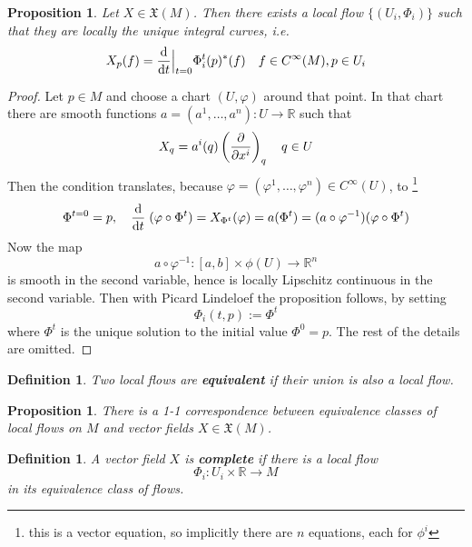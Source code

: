 \documentclass{article}
\numberwithin{theorem}{section}
\newtheorem{proposition}[theorem]{Proposition}
\newtheorem{definition}[theorem]{Definition}
\newcommand{\R}{\mathbb{R}}
\newcommand{\1}{\mathds{1}}
\begin{document}
\begin{proposition}
    Let $X\in \mathfrak{X}(M)$. Then there exists a local flow $\{ (U_i, \Phi_i)\}$ such that they are locally the unique integral curves, i.e. 
    \[ X_p(f) = \dv{}{t}\Big|_{t=0} \Phi_i^t(p)^*(f) \quad f \in C^\infty(M), p \in U_i \]
\end{proposition}
\begin{proof}
    Let $p \in M$ and choose a chart $(U,\varphi)$ around that point. In that chart there are smooth functions $a = (a^1, \dots, a^n) : U \to \R$ such that 
    \[ X_q  = a^i(q) \left( \pdv{}{x^i} \right)_q \quad q\in U   \]
    Then the condition translates, because $\varphi = (\varphi^1, \dots, \varphi^n) \in C^\infty(U)$, to \footnote{this is a vector equation, so implicitly there are $n$ equations, each for $\phi^i$} 
    \[ \Phi^{t = 0 } =p, \quad  \dv{}{t} \; (\varphi \circ \Phi^t) = X_{\Phi^t }(\varphi) = a(\Phi^t)  = (a \circ \varphi^{-1})(\varphi\circ \Phi^t)\]
    Now the map 
    \[ a\circ \varphi^{-1} : [a,b] \times \phi(U) \to \R^n \]
    is smooth in the second variable, hence is locally Lipschitz continuous in the second variable. Then with Picard Lindeloef the proposition follows, by setting 
    \[ \Phi_i(t,p) := \Phi^t  \]
    where $\Phi^t$ is the unique solution to the initial value $\Phi^0 = p $. The rest of the details are omitted. 
\end{proof}

\begin{definition}
    Two local flows are \textbf{equivalent}  if their union is also a local flow. 
\end{definition}

\begin{proposition}
    There is a 1-1 correspondence between equivalence classes of local flows on $M$ and vector fields $X \in \mathfrak{X}(M)$. 
\end{proposition}

\begin{definition}
    A vector field $X$ is \textbf{complete} if there is a local flow 
    \[ \Phi_i : U_i \times \R \to M \]
    in its equivalence class of flows. 
\end{definition}
\end{document}
